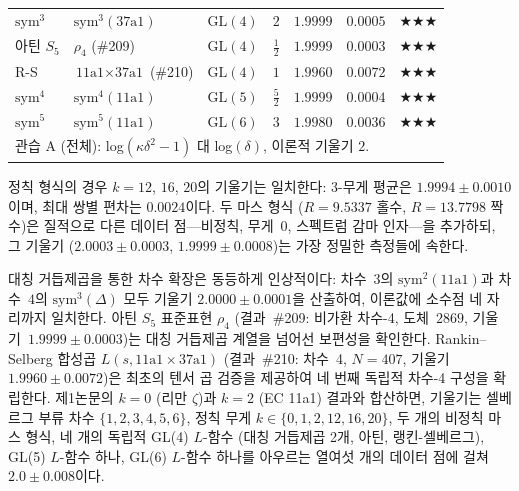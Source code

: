 \documentclass[11pt, a4paper]{article}
\theoremstyle{plain}
\theoremstyle{definition}
\begin{document}
\begin{table}[ht]
\begin{tabular}{llllrrl}
$\mathrm{sym}^{3}$ & $\mathrm{sym}^{3}(\text{37a1})$ & $\mathrm{GL}(4)$ & $2$ & $\mathbf{1.9999}$ & $\mathbf{0.0005}$ & $\bigstar\bigstar\bigstar$ \\
아틴 $S_5$ & $\rho_4$ (\#209) & $\mathrm{GL}(4)$ & $\tfrac{1}{2}$ & $\mathbf{1.9999}$ & $\mathbf{0.0003}$ & $\bigstar\bigstar\bigstar$ \\
R-S & $\text{11a1}\times\text{37a1}$ (\#210) & $\mathrm{GL}(4)$ & $1$ & $\mathbf{1.9960}$ & $\mathbf{0.0072}$ & $\bigstar\bigstar\bigstar$ \\
$\mathrm{sym}^{4}$ & $\mathrm{sym}^{4}(\text{11a1})$ & $\mathrm{GL}(5)$ & $\tfrac{5}{2}$ & $\mathbf{1.9999}$ & $\mathbf{0.0004}$ & $\bigstar\bigstar\bigstar$ \\
$\mathrm{sym}^{5}$ & $\mathrm{sym}^{5}(\text{11a1})$ & $\mathrm{GL}(6)$ & $3$ & $\mathbf{1.9980}$ & $\mathbf{0.0036}$ & $\bigstar\bigstar\bigstar$ \\
\bottomrule
\multicolumn{7}{l}{\small 관습 A (전체): log$(\kappa\delta^2-1)$ 대 log$(\delta)$, 이론적 기울기 $2$.} \\
\end{tabular}
\end{table}

정칙 형식의 경우 $k=12$, $16$, $20$의 기울기는 일치한다: 3-무게 평균은
$1.9994\pm 0.0010$이며, 최대 쌍별 편차는 $0.0024$이다.
두 마스 형식 ($R=9.5337$ 홀수, $R=13.7798$ 짝수)은
질적으로 다른 데이터 점---비정칙, 무게~$0$, 스펙트럼 감마 인자---을 추가하되,
그 기울기 ($2.0003\pm 0.0003$, $1.9999\pm 0.0008$)는
가장 정밀한 측정들에 속한다.

대칭 거듭제곱을 통한 차수 확장은 동등하게 인상적이다:
차수~$3$의 $\mathrm{sym}^{2}(\text{11a1})$과
차수~$4$의 $\mathrm{sym}^{3}(\Delta)$ 모두 기울기 $2.0000\pm 0.0001$을 산출하여,
이론값에 소수점 네 자리까지 일치한다.
아틴 $S_5$ 표준표현 $\rho_4$ (결과~\#209: 비가환 차수-4, 도체~$2869$,
기울기~$1.9999\pm 0.0003$)는 대칭 거듭제곱 계열을 넘어선 보편성을 확인한다.
Rankin--Selberg 합성곱 $L(s,\text{11a1}\times\text{37a1})$
(결과~\#210: 차수~4, $N=407$, 기울기~$1.9960\pm 0.0072$)은
최초의 텐서 곱 검증을 제공하여 네 번째 독립적 차수-4 구성을 확립한다.
제1논문의 $k=0$ (리만 $\zeta$)과 $k=2$ (EC 11a1) 결과와 합산하면,
기울기는 셀베르그 부류 차수 $\{1,2,3,4,5,6\}$,
정칙 무게 $k\in\{0,1,2,12,16,20\}$, 두 개의 비정칙 마스 형식,
네 개의 독립적 GL(4) $L$-함수 (대칭 거듭제곱 2개, 아틴, 랭킨-셀베르그),
GL(5) $L$-함수 하나, GL(6) $L$-함수 하나를 아우르는
열여섯 개의 데이터 점에 걸쳐 $2.0\pm 0.008$이다.
\end{document}
